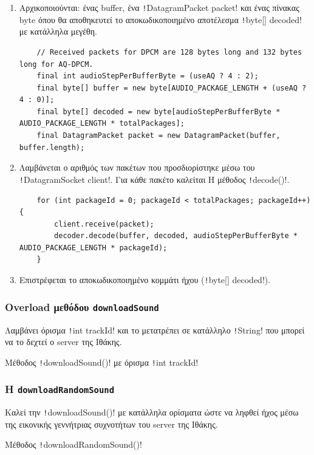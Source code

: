 \begin{enumerate}
    \item Αρχικοποιούνται: ένας buffer, ένα \texttt!DatagramPacket packet! και ένας πίνακας byte όπου θα αποθηκευτεί το αποκωδικοποιημένο αποτέλεσμα \texttt!byte[] decoded! με κατάλληλα μεγέθη.
    \begin{verbatim}
    // Received packets for DPCM are 128 bytes long and 132 bytes long for AQ-DPCM.
    final int audioStepPerBufferByte = (useAQ ? 4 : 2);
    final byte[] buffer = new byte[AUDIO_PACKAGE_LENGTH + (useAQ ? 4 : 0)];
    final byte[] decoded = new byte[audioStepPerBufferByte * AUDIO_PACKAGE_LENGTH * totalPackages];
    final DatagramPacket packet = new DatagramPacket(buffer, buffer.length);
    \end{verbatim}

    \item Λαμβάνεται ο αριθμός των πακέτων που προσδιορίστηκε μέσω του \texttt!DatagramSocket client!.
    Για κάθε πακέτο καλείται Η μέθοδος \texttt!decode()!.
    \begin{verbatim}
    for (int packageId = 0; packageId < totalPackages; packageId++) {
        client.receive(packet);
        decoder.decode(buffer, decoded, audioStepPerBufferByte * AUDIO_PACKAGE_LENGTH * packageId);
    }
    \end{verbatim}

    \item Επιστρέφεται το αποκωδικοποιημένο κομμάτι ήχου (\texttt!byte[] decoded!).
\end{enumerate}

\subsubsection{Overload μεθόδου \texttt{downloadSound}}\label{section:downloadSound-overload}
Λαμβάνει όρισμα \texttt!int trackId! και το μετατρέπει σε κατάλληλο \texttt!String! που μπορεί να το δεχτεί ο server της Ιθάκης.
\begin{code}
\caption{Μέθοδος \texttt!downloadSound()! με όρισμα \texttt!int trackId!}
\end{code}

\subsubsection{Η \texttt{downloadRandomSound}}
Καλεί την \texttt!downloadSound()! με κατάλληλα ορίσματα ώστε να ληφθεί ήχος μέσω της εικονικής γεννήτριας συχνοτήτων του server της Ιθάκης.
\begin{code}
\caption{Μέθοδος \texttt!downloadRandomSound()!}
\end{code}

